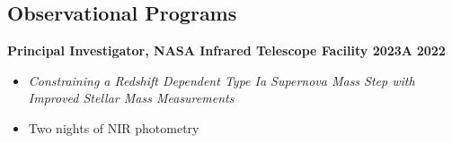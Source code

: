 \documentclass[margin]{res}
\begin{document}
\begin{resume}






\section{Observational Programs} %

{\bf Principal Investigator, NASA Infrared Telescope Facility 2023A} \hfill \textbf{2022} 
\begin{itemize} \itemsep -2pt %
     \item[] \textit{Constraining a Redshift Dependent Type Ia Supernova Mass Step with \\Improved Stellar Mass Measurements}
     \item[] Two nights of NIR photometry
 \end{itemize} \vspace{-12pt}



\end{resume}
\end{document}
